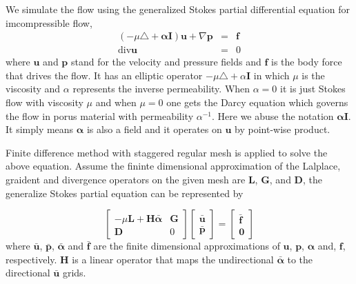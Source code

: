 \documentclass{article}
\begin{document}
We simulate the flow using the generalized Stokes partial differential equation for imcompressible flow,
\begin{eqnarray*}
( -\mu\triangle + \mathbf{\alpha} \mathbf{I}) \mathbf{u} +\nabla  \mathbf{p} & = & \mathbf{f}\\
 \mbox{div} \mathbf{u}& = & 0 
\end{eqnarray*}
where $\mathbf{u}$ and $\mathbf{p}$ stand for the velocity and pressure fields  and $\mathbf{f}$ is the body force that drives the flow. It has an elliptic operator $-\mu\triangle + \alpha \mathbf{I}$ in which $\mu$ is the viscosity and $\alpha$ represents the inverse permeability. When $\alpha = 0 $ it is just Stokes flow with viscosity $\mu$ and when $\mu=0$ one gets the Darcy equation which governs the flow in porus material with permeability $\alpha^{-1}$. Here we abuse the notation $\mathbf{\alpha} \mathbf{I}$. It simply means $\mathbf{\alpha}$ is also a field and it operates on $\mathbf{u}$ by point-wise product. 

Finite difference method with staggered regular mesh is applied to solve the above equation. Assume the fininte dimensional approximation of the Lalplace, graident and divergence operators on the given mesh are $\mathbf{L}$, $\mathbf{G}$, and $\mathbf{D}$, the generalize Stokes partial equation can be represented by
  
\begin{equation}
\left[\begin{matrix}
  -\mu \mathbf{L} + \mathbf{H} \mathbf{\bar{\alpha}}  & \mathbf{G}\\
   \mathbf{D}               &  0 
\end{matrix} \right]
\left[\begin{matrix}
  \mathbf{\bar{u}} \\ \mathbf{\bar{p}}
\end{matrix} \right]= 
\left[\begin{matrix}
  \mathbf{\bar{f}} \\ \mathbf{0}
\end{matrix} \right]
\end{equation}
where $\mathbf{\bar{u}}$, $\mathbf{\bar{p}}$, $\mathbf{\bar{\alpha}}$ and $\mathbf{\bar{f}}$ are the finite dimensional approximations of $\mathbf{u}$, $\mathbf{p}$, $\mathbf{\alpha}$ and, $\mathbf{f}$, respectively. $\mathbf{H}$ is a linear operator that maps the undirectional $\mathbf{\bar{\alpha}}$ to the directional $\mathbf{\bar{u}}$ grids. 
 
\end{document}
